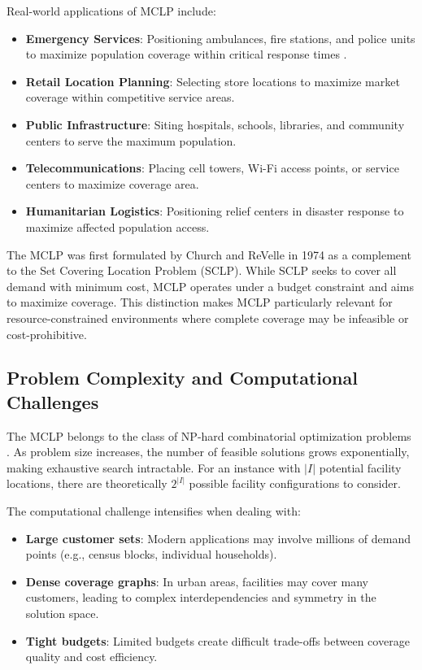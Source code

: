 \documentclass[11pt,a4paper]{article}
\begin{document}
Real-world applications of MCLP include:
\begin{itemize}
  \item \textbf{Emergency Services}: Positioning ambulances, fire stations, and police units to maximize population coverage within critical response times \cite{church1974}.
  \item \textbf{Retail Location Planning}: Selecting store locations to maximize market coverage within competitive service areas.
  \item \textbf{Public Infrastructure}: Siting hospitals, schools, libraries, and community centers to serve the maximum population.
  \item \textbf{Telecommunications}: Placing cell towers, Wi-Fi access points, or service centers to maximize coverage area.
  \item \textbf{Humanitarian Logistics}: Positioning relief centers in disaster response to maximize affected population access.
\end{itemize}

The MCLP was first formulated by Church and ReVelle in 1974 \cite{church1974} as a complement to the Set Covering Location Problem (SCLP). While SCLP seeks to cover all demand with minimum cost, MCLP operates under a budget constraint and aims to maximize coverage. This distinction makes MCLP particularly relevant for resource-constrained environments where complete coverage may be infeasible or cost-prohibitive.

\subsection{Problem Complexity and Computational Challenges}

The MCLP belongs to the class of NP-hard combinatorial optimization problems \cite{megiddo1983}. As problem size increases, the number of feasible solutions grows exponentially, making exhaustive search intractable. For an instance with $|I|$ potential facility locations, there are theoretically $2^{|I|}$ possible facility configurations to consider.

The computational challenge intensifies when dealing with:
\begin{itemize}
  \item \textbf{Large customer sets}: Modern applications may involve millions of demand points (e.g., census blocks, individual households).
  \item \textbf{Dense coverage graphs}: In urban areas, facilities may cover many customers, leading to complex interdependencies and symmetry in the solution space.
  \item \textbf{Tight budgets}: Limited budgets create difficult trade-offs between coverage quality and cost efficiency.
\end{itemize}
\end{document}
